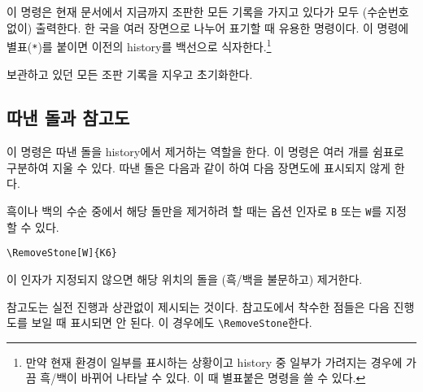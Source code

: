 \documentclass[figtabcapt,a4paper]{oblivoir}
\begin{document}
이 명령은 현재 문서에서 지금까지 조판한 모든 기록을 가지고 있다가 모두 (수순번호 없이) 출력한다.
한 국을 여러 장면으로 나누어 표기할 때 유용한 명령이다.
이 명령에 별표(\verb|*|)를 붙이면 이전의 history를 백선으로 식자한다.\footnote{%
	만약 현재 환경이 일부를 표시하는 상황이고 history 중 일부가 가려지는 경우에
	가끔 흑/백이 바뀌어 나타날 수 있다. 이 때 별표붙은 명령을 쓸 수 있다.}

\begin{boxedverbatim}
\ClearHistory
\end{boxedverbatim}

보관하고 있던 모든 조판 기록을 지우고 초기화한다.

\subsection{따낸 돌과 참고도}

\begin{boxedverbatim}
\end{boxedverbatim}
이 명령은 따낸 돌을 history에서 제거하는 역할을 한다.
이 명령은 여러 개를 쉼표로 구분하여 지울 수 있다.
따낸 돌은 다음과 같이 하여 다음 장면도에 표시되지 않게 한다.

\ClearHistory

\begin{boxedverbatim}
\begin{ksbadukpan}[badukpansize=6][D]
\end{ksbadukpan}
\begin{ksbadukpan}[badukpansize=6][D]
\KSBadukContinue
\end{ksbadukpan}
\end{boxedverbatim}

\begin{ksbadukpan}[badukpansize=6][D]
\end{ksbadukpan}
\hfill
\begin{ksbadukpan}[badukpansize=6][D]
\KSBadukContinue
\end{ksbadukpan}

흑이나 백의 수순 중에서 해당 돌만을 제거하려 할 때는 옵션 인자로 \texttt{B} 또는 \texttt{W}를 지정할 수 있다.
\begin{verbatim}
\RemoveStone[W]{K6}
\end{verbatim}
이 인자가 지정되지 않으면 해당 위치의 돌을 (흑/백을 불문하고) 제거한다.

참고도는 실전 진행과 상관없이 제시되는 것이다. 참고도에서 착수한 점들은 다음 진행도를
보일 때 표시되면 안 된다. 이 경우에도 \verb|\RemoveStone|한다.
\end{document}
